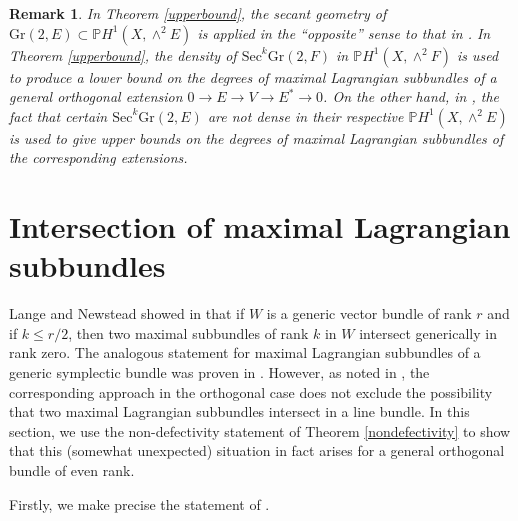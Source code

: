 \documentclass[10pt]{amsart}
\numberwithin{equation}{section}
\newcommand{\pp}{\mathbb P}
\newcommand{\Sec}{\mathrm{Sec}}
\newcommand{\Gr}{\mathrm{Gr}}
\newtheorem{rmk}[theorem]{{\textbf Remark}}
\newenvironment{remark}{\begin{rmk}\rm}{\end{rmk}}
\begin{document}
\begin{remark} In Theorem \ref{upperbound}, the secant geometry of $\Gr(2, E) \subset \pp H^1 (X, \wedge^2 E)$ is applied in the ``opposite'' sense to that in \cite[\S 5]{CH3}. In Theorem \ref{upperbound}, the density of $\Sec^k \Gr(2, F)$ in $\pp H^1 (X, \wedge^2 F)$ is used to produce a \emph{lower} bound on the degrees of maximal Lagrangian subbundles of a general orthogonal extension $0 \to E \to V \to E^* \to 0$. On the other hand, in \cite[Theorem 5.2]{CH3}, the fact that certain $\Sec^k \Gr(2, E)$ are \emph{not} dense in their respective $\pp H^1 (X, \wedge^2 E)$ is used to give \emph{upper} bounds on the degrees of maximal Lagrangian subbundles of the corresponding extensions. \end{remark}

\section{Intersection of maximal Lagrangian subbundles}

Lange and Newstead showed in \cite[Proposition 2.4]{LaNe} that if $W$ is a generic vector bundle of rank $r$ and if $k \leq r/2$, then two maximal subbundles of rank $k$ in $W$ intersect generically in rank zero. The analogous statement for maximal Lagrangian subbundles of a generic symplectic bundle was proven in \cite[Theorem 4.1 (3)]{CH3}. However, as noted in \cite[Remark 5.1]{CH3}, the corresponding approach in the orthogonal case does not exclude the possibility that two maximal Lagrangian subbundles intersect in a line bundle. %
 In this section, we use the non-defectivity statement of Theorem \ref{nondefectivity} to show that this (somewhat unexpected) situation in fact arises for a general orthogonal bundle of even rank.

Firstly, we make precise the statement of \cite[Remark 5.1]{CH3}. 
\end{document}
